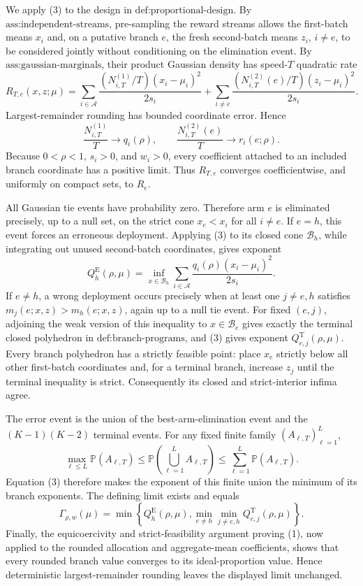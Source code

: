 We apply (3) to the design in \(\text{def:proportional-design}\). By \(\text{ass:independent-streams}\), pre-sampling the reward streams allows the first-batch means \(x_i\) and, on a putative branch \(e\), the fresh second-batch means \(z_i\), \(i\ne e\), to be considered jointly without conditioning on the elimination event. By \(\text{ass:gaussian-marginals}\), their product Gaussian density has speed-\(T\) quadratic rate
\[
 R_{T,e}(x,z;\mu)
 =\sum_{i\in\mathcal A}
 \frac{(N_{i,T}^{(1)}/T)(x_i-\mu_i)^2}{2s_i}
 +\sum_{i\ne e}
 \frac{(N_{i,T}^{(2)}(e)/T)(z_i-\mu_i)^2}{2s_i}.
\]
Largest-remainder rounding has bounded coordinate error. Hence
\[
 \frac{N_{i,T}^{(1)}}T\longrightarrow q_i(\rho),
 \qquad
 \frac{N_{i,T}^{(2)}(e)}T\longrightarrow r_i(e;\rho).
\]
Because \(0<\rho<1\), \(s_i>0\), and \(w_i>0\), every coefficient attached to an included branch coordinate has a positive limit. Thus \(R_{T,e}\) converges coefficientwise, and uniformly on compact sets, to \(R_e\).

All Gaussian tie events have probability zero. Therefore arm \(e\) is eliminated precisely, up to a null set, on the strict cone \(x_e<x_i\) for all \(i\ne e\). If \(e=h\), this event forces an erroneous deployment. Applying (3) to its closed cone \(\mathcal B_h\), while integrating out unused second-batch coordinates, gives exponent
\[
 Q_h^{\mathrm E}(\rho,\mu)
 =\inf_{x\in\mathcal B_h}
 \sum_{i\in\mathcal A}\frac{q_i(\rho)(x_i-\mu_i)^2}{2s_i}.
\]
If \(e\ne h\), a wrong deployment occurs precisely when at least one \(j\ne e,h\) satisfies \(m_j(e;x,z)>m_h(e;x,z)\), again up to a null tie event. For fixed \((e,j)\), adjoining the weak version of this inequality to \(x\in\mathcal B_e\) gives exactly the terminal closed polyhedron in \(\text{def:branch-programs}\), and (3) gives exponent \(Q_{e,j}^{\mathrm T}(\rho,\mu)\). Every branch polyhedron has a strictly feasible point: place \(x_e\) strictly below all other first-batch coordinates and, for a terminal branch, increase \(z_j\) until the terminal inequality is strict. Consequently its closed and strict-interior infima agree.

The error event is the union of the best-arm-elimination event and the \((K-1)(K-2)\) terminal events. For any fixed finite family \((A_{\ell,T})_{\ell=1}^L\),
\[
 \max_{\ell\leq L}\mathbb P(A_{\ell,T})
 \leq \mathbb P\!\left(\bigcup_{\ell=1}^L A_{\ell,T}\right)
 \leq \sum_{\ell=1}^L\mathbb P(A_{\ell,T}).
\]
Equation (3) therefore makes the exponent of this finite union the minimum of its branch exponents. The defining limit exists and equals
\[
 \Gamma_{\rho,w}(\mu)
 =\min\left\{Q_h^{\mathrm E}(\rho,\mu),
 \min_{e\ne h}\min_{j\ne e,h}Q_{e,j}^{\mathrm T}(\rho,\mu)\right\}.
\]
Finally, the equicoercivity and strict-feasibility argument proving (1), now applied to the rounded allocation and aggregate-mean coefficients, shows that every rounded branch value converges to its ideal-proportion value. Hence deterministic largest-remainder rounding leaves the displayed limit unchanged.

